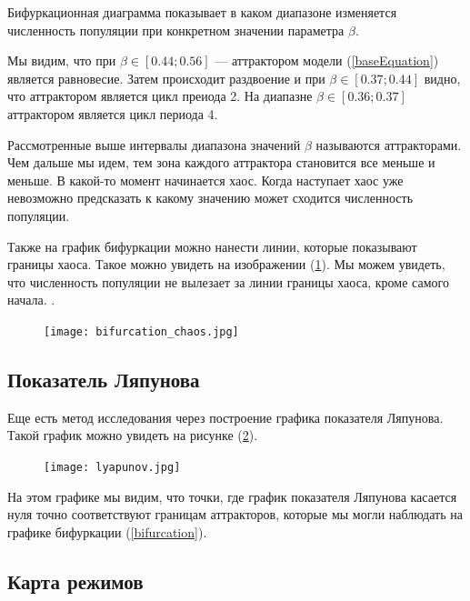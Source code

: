         Бифуркационная диаграмма показывает в каком диапазоне изменяется численность популяции при конкретном значении параметра \(\beta\).

        Мы видим, что при \(\beta \in [0.44; 0.56]\) --- аттрактором модели (\ref{baseEquation}) является равновесие. Затем происходит раздвоение и при \(\beta \in [0.37; 0.44]\) видно, что аттрактором является цикл преиода 2. На диапазне \(\beta \in [0.36; 0.37]\) аттрактором является цикл периода 4.
        
        Рассмотренные выше интервалы диапазона значений \(\beta\) называются аттракторами. Чем дальше мы идем, тем зона каждого аттрактора становится все меньше и меньше. В какой-то момент начинается хаос. Когда наступает хаос уже невозможно предсказать к какому значению может сходится численность популяции.




        Также на график бифуркации можно нанести линии, которые показывают границы хаоса. Такое можно увидеть на изображении (\ref{bifurcation_chaos}). Мы можем увидеть, что численность популяции не вылезает за линии границы хаоса, кроме самого начала. .

        \begin{figure}
            \centering
            \texttt{[image: bifurcation\_chaos.jpg]}

            \captionsetup{justification=centering}
            \caption{}
            \label{bifurcation_chaos}
        \end{figure}

    \subsection{Показатель Ляпунова}    

        Еще есть метод исследования через построение графика показателя Ляпунова. Такой график можно увидеть на рисунке (\ref{lyapunov}).

        \begin{figure}
            \centering
            \texttt{[image: lyapunov.jpg]}

            \captionsetup{justification=centering}
            \caption{}
            \label{lyapunov}
        \end{figure}

        На этом графике мы видим, что точки, где график показателя Ляпунова касается нуля точно соответствуют границам аттракторов, которые мы могли наблюдать на графике бифуркации (\ref{bifurcation}).

    \subsection{Карта режимов}

